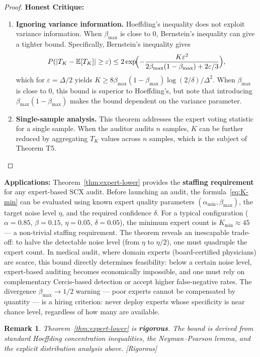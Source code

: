 \documentclass[12pt,a4paper]{article}
\newtheorem{remark}[theorem]{Remark}
\newenvironment{critique}
  {\medskip\noindent\textcolor{red!60!black}{\textbf{Honest Critique:}}\par\smallskip
   \color{red!60!black}\begin{enumerate}[label=\textbullet,leftmargin=*,nosep]}
  {\end{enumerate}\color{black}\medskip}
\newcommand{\rigorous}{\textcolor{green!50!black}{\small\textsf{[Rigorous]}}}
\newcommand{\E}{\mathbb{E}}
\newcommand{\gap}{\Delta}
\begin{document}
\begin{proof}
\begin{critique}
    \item \textbf{Ignoring variance information.} Hoeffding's inequality does not exploit variance information. When
          $\beta_{\max}$ is close to $0$, Bernstein's inequality can give a tighter bound.
          Specifically, Bernstein's inequality gives
          \[
          P(|T_K-\E[T_K]|\geq\varepsilon) \leq 2\exp\!\Bigl(-\frac{K\varepsilon^{2}}{2\beta_{\max}(1-\beta_{\max})+2\varepsilon/3}\Bigr),
          \]
          which for $\varepsilon=\gap/2$ yields $K \geq 8\beta_{\max}(1-\beta_{\max})\log(2/\delta)/\gap^{2}$.
          When $\beta_{\max}$ is close to $0$, this bound is superior to Hoeffding's, but note that
          introducing $\beta_{\max}(1-\beta_{\max})$ makes the bound dependent on the variance parameter.

    \item \textbf{Single-sample analysis.} This theorem addresses the expert voting statistic for a single sample. When the auditor audits
          $n$ samples, $K$ can be further reduced by aggregating $T_K$ values across $n$ samples, which is
          the subject of Theorem T5.
\end{critique}
\end{proof}

\medskip\noindent
\textbf{Applications:}
Theorem~\ref{thm:expert-lower} provides the \textbf{staffing requirement} for
any expert-based \textsf{SCX} audit.  Before launching an audit, the formula~\eqref{eq:K-min}
can be evaluated using known expert quality parameters $(\alpha_{\min},\beta_{\max})$,
the target noise level $\eta$, and the required confidence $\delta$.  For a
typical configuration ($\alpha=0.85$, $\beta=0.15$, $\eta=0.05$, $\delta=0.05$),
the minimum expert count is $K_{\min}\approx 45$ --- a non-trivial staffing
requirement.  The theorem reveals an inescapable trade-off: to halve the
detectable noise level (from $\eta$ to $\eta/2$), one must quadruple the
expert count.  In medical audit, where domain experts (board-certified
physicians) are scarce, this bound directly determines feasibility: below a
certain noise level, expert-based auditing becomes economically impossible,
and one must rely on complementary Cercis-based detection or accept higher
false-negative rates.  The divergence $\beta_{\max}\to1/2$ warning --- poor
experts cannot be compensated by quantity --- is a hiring criterion: never
deploy experts whose specificity is near chance level, regardless of how many
are available.

\begin{remark}
Theorem~\ref{thm:expert-lower} is \textbf{rigorous}.  The bound is derived from
standard Hoeffding concentration inequalities, the Neyman--Pearson lemma, and
the explicit distribution analysis above.  \rigorous
\end{remark}
\end{document}
